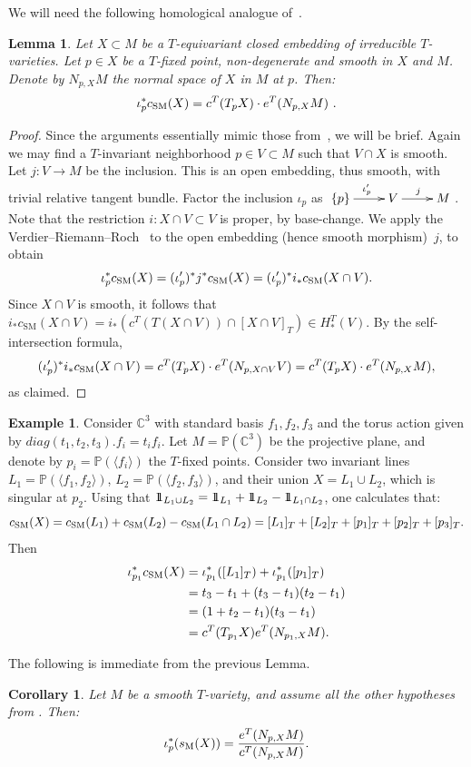 \documentclass[11pt]{article}
\newtheorem{lemma}[theo]{Lemma}
\newtheorem{corol}[theo]{Corollary}
\theoremstyle{definition}
\newtheorem{example}[theo]{Example}
\numberwithin{equation}{section}
\newcommand{\bP}{{\mathbb{P}}}
\newcommand{\csm}{c_{\mathrm{SM}}}
\newcommand{\ssm}{s_{\mathrm{M}}}
\newcommand{\one}{1\hskip-3.5pt1}
\begin{document}
We will need the following homological analogue of~\cite[Lemma 9.3]{AMSS:motivic}.
\begin{lemma}\label{lemma:locssm} Let $X \subset M$ be a $T$-equivariant closed embedding of 
	irreducible $T$-varieties. Let $p \in X$ be a $T$-fixed point, non-degenerate and smooth in $X$ and $M$.
	Denote by $N_{p,X} M$ the normal space
	of $X$ in $M$ at $p$. Then:
	\[ \iota^*_p \csm(X) = c^T(T_pX) \cdot e^T(N_{p,X} M)~\/. \] 
\end{lemma}
\begin{proof} Since the arguments essentially mimic those from~\cite{AMSS:motivic},
	we will be brief. Again we may find a $T$-invariant neighborhood $p \in V \subset M$ such that $V \cap X$ is smooth.
	Let $j:V \to M$ be the inclusion. This is an open embedding, thus smooth, with trivial relative tangent bundle. Factor the inclusion $\iota_p$ as 
	$\xymatrix{ \{ p \} \ar[r]^{\iota_p'} & V \ar[r]^j & M }$. Note that the restriction $i: X \cap V \subset V$ is proper, by base-change.  
	We apply the Verdier--Riemann--Roch~\cite[Theorem 4.1]{ohmoto:eqcsm} to the open embedding
	(hence smooth morphism)~$j$, to obtain
	\[ \iota_p^* \csm(X) = (\iota'_p)^* j^* \csm(X) = (\iota'_p)^* i_*\csm(X \cap V) \/. \]
	Since $X \cap V$ is smooth, it follows that $i_*\csm(X \cap V) = i_* (c^T (T({X \cap V})) \cap [X \cap V]_T) \in H_*^T(V)$.
	By the self-intersection formula,
	\[ (\iota'_p)^* i_*\csm(X \cap V) = c^T (T_{p}X) \cdot e^T(N_{p,X \cap V}V) = c^T (T_{p}X) \cdot e^T(N_{p,X}M ) \/, \]
	as claimed.\end{proof}
\begin{example} Consider $\mathbb{C}^3$ with standard basis $f_1, f_2, f_3$ and the torus action
		given by $diag(t_1, t_2,t_3).f_i = t_if_i$. Let
		$M= \bP(\mathbb{C}^3)$ be the projective plane, and denote by 
		$p_i= \bP(\langle f_i \rangle)$ the $T$-fixed points. 
		Consider two invariant lines $L_1 = \bP(\langle f_1, f_2 \rangle)$, 
		$L_2 = \bP(\langle f_2, f_3 \rangle)$, and their union $X= L_1 \cup L_2$, which is singular at $p_2$. 
		Using that $\one_{L_1 \cup L_2} = \one_{L_1} + \one_{L_2} - \one_{L_1 \cap L_2}$, 
		one calculates that:
		\[ \csm(X) = \csm(L_1) + \csm(L_2) - \csm(L_1 \cap L_2) = [L_1]_T+ [L_2]_T + [p_1]_T + [p_2]_T + [p_3]_T \/. \]
		Then
		\[ \begin{split} \iota^*_{p_1} \csm(X)  & =  \iota^*_{p_1} ([L_1]_T) + \iota^*_{p_1} ([p_1]_T) \\
			& = t_3-t_1 + (t_3-t_1)(t_2-t_1) \\
			& = (1+ t_2-t_1)(t_3-t_1) \\
			&= c^T(T_{p_1} X) e^T(N_{p_1, X} M) \/. \end{split}\]
	\end{example}
The following is immediate from the previous Lemma.
\begin{corol}\label{cor:issm} Let $M$ be a smooth $T$-variety, and assume all the other hypotheses from . Then:
	\[ \iota_p^*(\ssm(X)) = \frac{e^T(N_{p,X} M)}{c^T(N_{p,X} M)} \/. \]
\end{corol}
\end{document}
